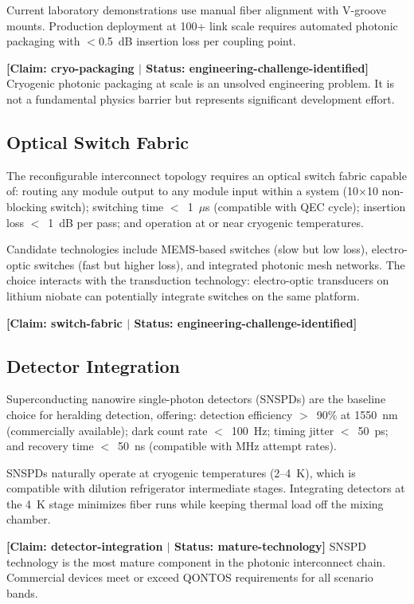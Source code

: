 \documentclass[conference]{IEEEtran}
\begin{document}
Current laboratory demonstrations use manual fiber alignment with V-groove mounts. Production deployment at 100+ link scale requires automated photonic packaging with $<$0.5~dB insertion loss per coupling point.

\textbf{[Claim: cryo-packaging $|$ Status: engineering-challenge-identified]} Cryogenic photonic packaging at scale is an unsolved engineering problem. It is not a fundamental physics barrier but represents significant development effort.

\subsection{Optical Switch Fabric}

The reconfigurable interconnect topology requires an optical switch fabric capable of: routing any module output to any module input within a system (10$\times$10 non-blocking switch); switching time $<$~1~$\mu$s (compatible with QEC cycle); insertion loss $<$~1~dB per pass; and operation at or near cryogenic temperatures.

Candidate technologies include MEMS-based switches (slow but low loss), electro-optic switches (fast but higher loss), and integrated photonic mesh networks. The choice interacts with the transduction technology: electro-optic transducers on lithium niobate can potentially integrate switches on the same platform.

\textbf{[Claim: switch-fabric $|$ Status: engineering-challenge-identified]}

\subsection{Detector Integration}

Superconducting nanowire single-photon detectors (SNSPDs) are the baseline choice for heralding detection, offering: detection efficiency $>$~90\% at 1550~nm (commercially available); dark count rate $<$~100~Hz; timing jitter $<$~50~ps; and recovery time $<$~50~ns (compatible with MHz attempt rates).

SNSPDs naturally operate at cryogenic temperatures (2--4~K), which is compatible with dilution refrigerator intermediate stages. Integrating detectors at the 4~K stage minimizes fiber runs while keeping thermal load off the mixing chamber.

\textbf{[Claim: detector-integration $|$ Status: mature-technology]} SNSPD technology is the most mature component in the photonic interconnect chain. Commercial devices meet or exceed QONTOS requirements for all scenario bands.
\end{document}

